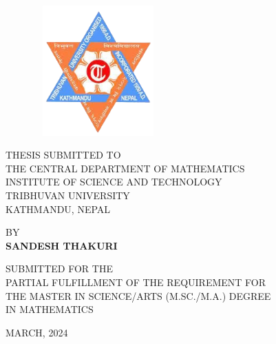 \begin{center}
  {\LARGE
    {\bfseries {\MakeTextUppercase {\thetitle}}}} \\

  \vspace{1.5cm}

\begin{figure}[h]
	\centering
	\includegraphics[height=5cm,width=5cm]{pictures/tulogo.png}
\end{figure}

\vspace{2cm}

	THESIS SUBMITTED TO\\ THE
	 CENTRAL DEPARTMENT OF MATHEMATICS\\
	INSTITUTE OF SCIENCE AND TECHNOLOGY\\
	TRIBHUVAN UNIVERSITY \\
	KATHMANDU, NEPAL\\

\vspace{1.5cm}

	BY\\
	{\bfseries SANDESH THAKURI}

\vspace{1.5cm}

SUBMITTED FOR THE\\
PARTIAL FULFILLMENT OF THE REQUIREMENT FOR\\
THE MASTER IN SCIENCE/ARTS (M.SC./M.A.)  DEGREE\\
IN MATHEMATICS\\

\vspace{1.5cm}

MARCH, 2024

\end{center}

\thispagestyle{empty}

\clearpage